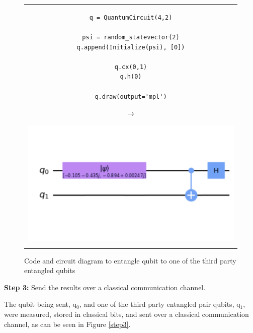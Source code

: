 \begin{figure}[H]
\centering
\begin{tabular}{c}
\begin{minipage}[c]{.45\linewidth}
\begin{verbatim}
q = QuantumCircuit(4,2)

psi = random_statevector(2)
q.append(Initialize(psi), [0])

q.cx(0,1)
q.h(0)

q.draw(output='mpl')
\end{verbatim}
\end{minipage}
\begin{minipage}[c]{.1\linewidth}
\centering
$\rightarrow$
\end{minipage}
\begin{minipage}[c]{.4\linewidth}
\centering
\includegraphics[width=\textwidth]{lab3/images/Step2.png}
\end{minipage}\\
\\ 
\end{tabular}
\captionsetup{font = it, labelfont = bf, width=.91\linewidth, justification=centering}
\caption{Code and circuit diagram to entangle qubit to one of the third party entangled qubits}
\label{step2}
\end{figure}


\textbf{Step 3:} Send the results over a classical communication channel.

The qubit being sent, q$_0$, and one of the third party entangled pair qubits, q$_1$, were measured, stored in classical bits, and sent over a classical communication channel, as can be seen in Figure \ref{step3}.

